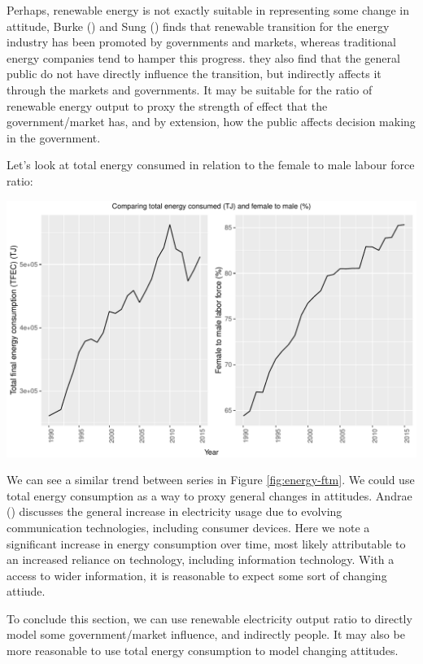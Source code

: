 \documentclass[11pt,a4paper,]{article}
\let\origfigure\figure
\let\endorigfigure\endfigure
\renewenvironment{figure}[1][2] {
    \expandafter\origfigure\expandafter[H]
} {
    \endorigfigure
}%
\begin{document}
Perhaps, renewable energy is not exactly suitable in representing some change in attitude, Burke (\textcite{Burke2018}) and Sung (\textcite{Sung2018}) finds that renewable transition for the energy industry has been promoted by governments and markets, whereas traditional energy companies tend to hamper this progress. they also find that the general public do not have directly influence the transition, but indirectly affects it through the markets and governments. It may be suitable for the ratio of renewable energy output to proxy the strength of effect that the government/market has, and by extension, how the public affects decision making in the government.

Let's look at total energy consumed in relation to the female to male labour force ratio:

\begin{figure}
\centering
\includegraphics{report_files/figure-latex/energy-ftm-1.pdf}
\caption{\label{fig:energy-ftm}Comparing total energy consumption and female to male ratio.}
\end{figure}

We can see a similar trend between series in Figure \ref{fig:energy-ftm}. We could use total energy consumption as a way to proxy general changes in attitudes. Andrae (\textcite{Andrae2015}) discusses the general increase in electricity usage due to evolving communication technologies, including consumer devices. Here we note a significant increase in energy consumption over time, most likely attributable to an increased reliance on technology, including information technology. With a access to wider information, it is reasonable to expect some sort of changing attiude.

To conclude this section, we can use renewable electricity output ratio to directly model some government/market influence, and indirectly people. It may also be more reasonable to use total energy consumption to model changing attitudes.
\end{document}
